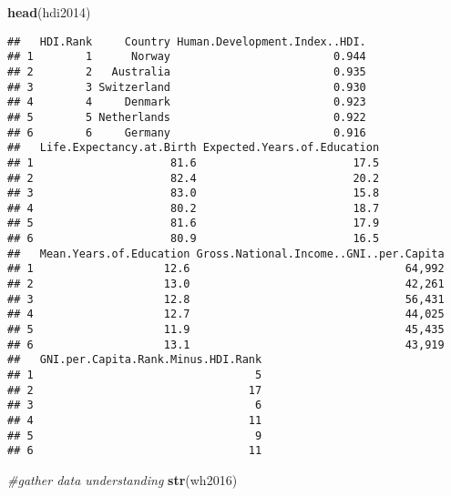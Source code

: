\documentclass[]{article}
\newenvironment{Shaded}{\begin{snugshade}}{\end{snugshade}}
\newcommand{\CommentTok}[1]{\textcolor[rgb]{0.56,0.35,0.01}{\textit{#1}}}
\newcommand{\KeywordTok}[1]{\textcolor[rgb]{0.13,0.29,0.53}{\textbf{#1}}}
\newcommand{\NormalTok}[1]{#1}
\begin{document}
\begin{Shaded}
\begin{Highlighting}[]
\KeywordTok{head}\NormalTok{(hdi2014)}
\end{Highlighting}
\end{Shaded}

\begin{verbatim}
##   HDI.Rank     Country Human.Development.Index..HDI.
## 1        1      Norway                         0.944
## 2        2   Australia                         0.935
## 3        3 Switzerland                         0.930
## 4        4     Denmark                         0.923
## 5        5 Netherlands                         0.922
## 6        6     Germany                         0.916
##   Life.Expectancy.at.Birth Expected.Years.of.Education
## 1                     81.6                        17.5
## 2                     82.4                        20.2
## 3                     83.0                        15.8
## 4                     80.2                        18.7
## 5                     81.6                        17.9
## 6                     80.9                        16.5
##   Mean.Years.of.Education Gross.National.Income..GNI..per.Capita
## 1                    12.6                                 64,992
## 2                    13.0                                 42,261
## 3                    12.8                                 56,431
## 4                    12.7                                 44,025
## 5                    11.9                                 45,435
## 6                    13.1                                 43,919
##   GNI.per.Capita.Rank.Minus.HDI.Rank
## 1                                  5
## 2                                 17
## 3                                  6
## 4                                 11
## 5                                  9
## 6                                 11
\end{verbatim}

\begin{Shaded}
\begin{Highlighting}[]
\CommentTok{#gather data understanding}
\KeywordTok{str}\NormalTok{(wh2016)}
\end{Highlighting}
\end{Shaded}
\end{document}
